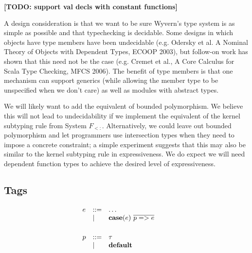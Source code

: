 \documentclass[11pt]{article}
\newcommand{\TODO}[1]{\textbf{[TODO: #1]}}
\newcommand{\keyw}[1]{\textbf{#1}}
\begin{document}
\begin{sloppypar}
\TODO{support val decls with constant functions}

A design consideration is that we want to be sure Wyvern's type system is as simple as possible and that typechecking is decidable.  Some designs in which objects have type members have been undecidable (e.g. Odersky et al. A Nominal Theory of Objects with Dependent Types, ECOOP 2003), but follow-on work has shown that this need not be the case (e.g. Cremet et al., A Core Calculus for Scala Type Checking, MFCS 2006).  The benefit of type members is that one mechanism can support generics (while allowing the member type to be unspecified when we don't care) as well as modules with abstract types.

We will likely want to add the equivalent of bounded polymorphism.  We believe this will not lead to undecidability if we implement the equivalent of the kernel subtyping rule from System $F_{<:}$.  Alternatively, we could leave out bounded polymorphism and let programmers use intersection types when they need to impose a concrete constraint; a simple experiment suggests that this may also be similar to the kernel subtyping rule in expressiveness.  We do expect we will need dependent function types to achieve the desired level of expressiveness.

\newpage


\subsection{Tags}

\begin{figure}
\centering
\[
\begin{array}{lll}

e    & \bnfdef & \ldots \\
     & \bnfalt & \keyw{case}(e)~ \overline{p => e} \\ %
\\[1ex]

p    & \bnfdef & \tau \\
     & \bnfalt & \keyw{default} \\
\\[1ex]

	 
\end{array}
\begin{array}{lll}
~~~~
\end{array}
\begin{array}{lll}
	 

\end{array}\]
\end{figure}
\end{sloppypar}
\end{document}
